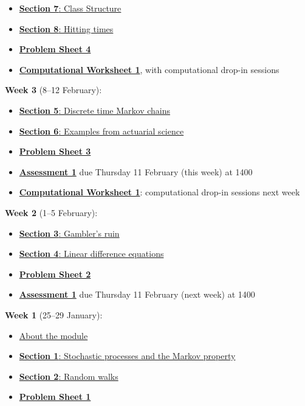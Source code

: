 \documentclass[
  a4paper,
]{article}
\providecommand{\tightlist}{%
  \setlength{\itemsep}{0pt}\setlength{\parskip}{0pt}}
\theoremstyle{definition}
\theoremstyle{definition}
\theoremstyle{definition}
\theoremstyle{remark}
\begin{document}
\begin{itemize}
\tightlist
\item
  \protect\hyperlink{S07-classes}{\textbf{Section 7}: Class Structure}
\item
  \protect\hyperlink{S08-hitting-times}{\textbf{Section 8}: Hitting times}
\item
  \protect\hyperlink{P04}{\textbf{Problem Sheet 4}}
\item
  \protect\hyperlink{computing}{\textbf{Computational Worksheet 1}}, with computational drop-in sessions
\end{itemize}

\textbf{Week 3} (8--12 February):

\begin{itemize}
\tightlist
\item
  \protect\hyperlink{S05-markov-chains}{\textbf{Section 5}: Discrete time Markov chains}
\item
  \protect\hyperlink{S06-examples}{\textbf{Section 6}: Examples from actuarial science}
\item
  \protect\hyperlink{P03}{\textbf{Problem Sheet 3}}
\item
  \protect\hyperlink{A1}{\textbf{Assessment 1}} due Thursday 11 February (this week) at 1400
\item
  \protect\hyperlink{computing}{\textbf{Computational Worksheet 1}}: computational drop-in sessions next week
\end{itemize}

\textbf{Week 2} (1--5 February):

\begin{itemize}
\tightlist
\item
  \protect\hyperlink{S03-gamblers-ruin}{\textbf{Section 3}: Gambler's ruin}
\item
  \protect\hyperlink{S04-ldes}{\textbf{Section 4}: Linear difference equations}
\item
  \protect\hyperlink{P02}{\textbf{Problem Sheet 2}}
\item
  \protect\hyperlink{A1}{\textbf{Assessment 1}} due Thursday 11 February (next week) at 1400
\end{itemize}

\textbf{Week 1} (25--29 January):

\begin{itemize}
\tightlist
\item
  \protect\hyperlink{S00-about}{About the module}
\item
  \protect\hyperlink{S01-stochastic-processes}{\textbf{Section 1}: Stochastic processes and the Markov property}
\item
  \protect\hyperlink{S02-random-walk}{\textbf{Section 2}: Random walks}
\item
  \protect\hyperlink{P01}{\textbf{Problem Sheet 1}}
\end{itemize}
\end{document}
